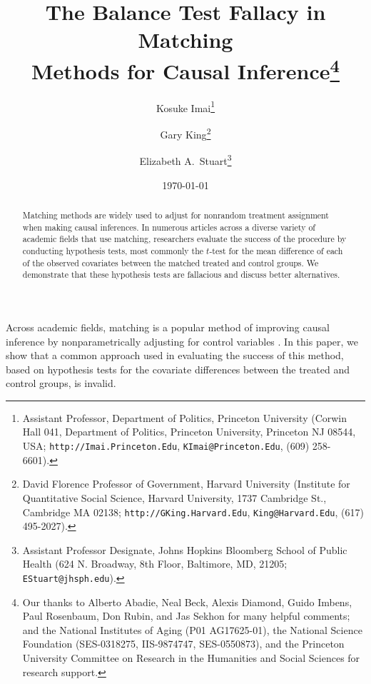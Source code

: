 \documentclass[11pt,titlepage]{article}
\title{The Balance Test Fallacy in Matching\\ Methods for Causal
  Inference\thanks{Our thanks to Alberto Abadie, Neal Beck, Alexis
    Diamond, Guido Imbens, Paul Rosenbaum, Don Rubin, and Jas Sekhon
    for many helpful comments; and the National Institutes of Aging
    (P01 AG17625-01), the National Science Foundation (SES-0318275,
    IIS-9874747, SES-0550873), and the Princeton University Committee
    on Research in the Humanities and Social Sciences for research
    support.}}
\author{Kosuke Imai\thanks{Assistant Professor, Department of
    Politics, Princeton University (Corwin Hall 041, Department of
    Politics, Princeton University, Princeton NJ 08544, USA;
    \texttt{http://Imai.Princeton.Edu}, \texttt{KImai@Princeton.Edu},
    (609) 258-6601).}
\and 
  Gary King\thanks{David Florence Professor of Government, Harvard
    University (Institute for Quantitative Social Science, Harvard
    University, 1737 Cambridge St., Cambridge MA 02138;
    \texttt{http://GKing.Harvard.Edu}, \texttt{King@Harvard.Edu},
    (617) 495-2027).}
\and 
  Elizabeth A.\ Stuart\thanks{Assistant Professor Designate, Johns Hopkins Bloomberg School
    of Public Health  (624 N. Broadway, 8th Floor, Baltimore, MD, 21205; 
    \texttt{EStuart@jhsph.edu}).}}
\date{\today}
\begin{document}
\maketitle

\begin{abstract}
  Matching methods are widely used to adjust for nonrandom treatment
  assignment when making causal inferences.  In numerous articles
  across a diverse variety of academic fields that use matching,
  researchers evaluate the success of the procedure by conducting
  hypothesis tests, most commonly the $t$-test for the mean difference
  of each of the observed covariates between the matched treated and
  control groups. We demonstrate that these hypothesis tests are
  fallacious and discuss better alternatives.
\end{abstract}

Across academic fields, matching is a popular method of improving
causal inference by nonparametrically adjusting for control variables
\citep{Imbens04,Rosenbaum02,Rubin06}.  In this paper, we show that a
common approach used in evaluating the success of this method, based
on hypothesis tests for the covariate differences between the treated
and control groups, is invalid.
\end{document}
